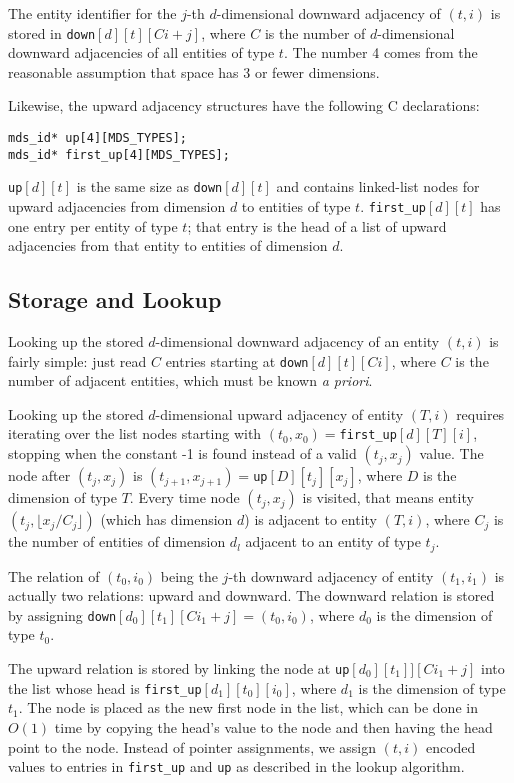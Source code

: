 \documentclass{article}
\begin{document}
The entity identifier for the $j$-th $d$-dimensional
downward adjacency of $(t,i)$ is stored in
\texttt{down}$[d][t][Ci+j]$, where $C$ is the number
of $d$-dimensional downward adjacencies of all entities
of type $t$.
The number 4 comes from the reasonable assumption that space has 3 or
fewer dimensions.

Likewise, the upward adjacency structures have the following
C declarations:

\begin{verbatim}
mds_id* up[4][MDS_TYPES];
mds_id* first_up[4][MDS_TYPES];
\end{verbatim}

\texttt{up}$[d][t]$ is the same size as \texttt{down}$[d][t]$
and contains linked-list nodes for upward adjacencies from dimension $d$
to entities of type $t$.
\texttt{first\_up}$[d][t]$ has one entry per entity of type $t$; that
entry is the head of a list of upward adjacencies from that entity
to entities of dimension $d$.

\subsection{Storage and Lookup}

Looking up the stored $d$-dimensional downward adjacency of an entity $(t,i)$
is fairly simple: just read $C$ entries starting at \texttt{down}$[d][t][Ci]$,
where $C$ is the number of adjacent entities, which must be known
{\it a priori}.

Looking up the stored $d$-dimensional upward adjacency of
entity $(T,i)$ requires iterating over the list nodes starting with
$(t_0,x_0)=$\texttt{first\_up}$[d][T][i]$, stopping when the constant
-1 is found instead of a valid $(t_j,x_j)$ value.
The node after $(t_j,x_j)$ is $(t_{j+1},x_{j+1})=$\texttt{up}$[D][t_j][x_j]$,
where $D$ is the dimension of type $T$.
Every time node $(t_j,x_j)$ is visited, that means entity
$(t_j,\lfloor x_j / C_j \rfloor)$ (which has dimension $d$)
is adjacent to entity $(T,i)$, where $C_j$ is the number of
entities of dimension $d_l$ adjacent to an entity of type $t_j$.

The relation of $(t_0,i_0)$ being the $j$-th downward adjacency
of entity $(t_1,i_1)$ is actually two relations: upward and downward.
The downward relation is stored by assigning
\texttt{down}$[d_0][t_1][Ci_1+j]=(t_0,i_0)$, where $d_0$ is the
dimension of type $t_0$.

The upward relation is stored by linking the node at
\texttt{up}$[d_0][t_1]][Ci_1+j]$
into the list whose head is \texttt{first\_up}$[d_1][t_0][i_0]$,
where $d_1$ is the dimension of type $t_1$.
The node is placed as the new first node in the list, which can be
done in $O(1)$ time by copying the head's value to the node
and then having the head point to the node.
Instead of pointer assignments, we assign $(t,i)$ encoded values
to entries in \texttt{first\_up} and \texttt{up} as described
in the lookup algorithm.
\end{document}

